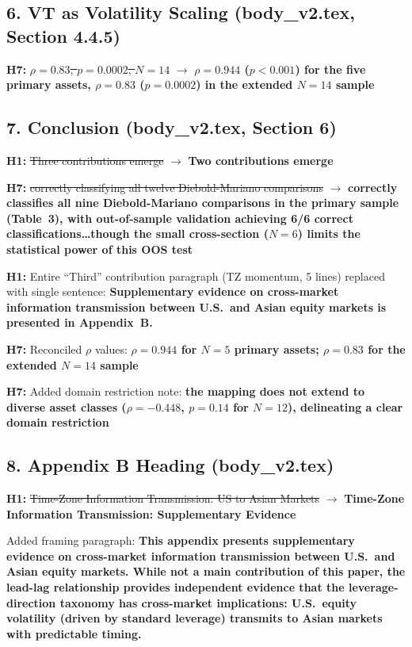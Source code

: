 \documentclass[12pt,a4paper]{article}
\newcommand{\old}[1]{\textcolor{oldred}{\st{#1}}}
\newcommand{\new}[1]{\textcolor{newgreen}{\textbf{#1}}}
\begin{document}
\subsection*{6. VT as Volatility Scaling (body\_v2.tex, Section 4.4.5)}

\textbf{H7:} \old{$\rho = 0.83$, $p = 0.0002$, $N = 14$} $\to$ \new{$\rho = 0.944$ ($p < 0.001$) for the five primary assets, $\rho = 0.83$ ($p = 0.0002$) in the extended $N = 14$ sample}

\subsection*{7. Conclusion (body\_v2.tex, Section 6)}

\textbf{H1:} \old{Three contributions emerge} $\to$ \new{Two contributions emerge}

\textbf{H7:} \old{correctly classifying all twelve Diebold-Mariano comparisons} $\to$ \new{correctly classifies all nine Diebold-Mariano comparisons in the primary sample (Table~3), with out-of-sample validation achieving 6/6 correct classifications\ldots though the small cross-section ($N = 6$) limits the statistical power of this OOS test}

\textbf{H1:} Entire ``Third'' contribution paragraph (TZ momentum, 5 lines) replaced with single sentence: \new{Supplementary evidence on cross-market information transmission between U.S.\ and Asian equity markets is presented in Appendix~B.}

\textbf{H7:} Reconciled $\rho$ values: \new{$\rho = 0.944$ for $N = 5$ primary assets; $\rho = 0.83$ for the extended $N = 14$ sample}

\textbf{H7:} Added domain restriction note: \new{the mapping does not extend to diverse asset classes ($\rho = -0.448$, $p = 0.14$ for $N = 12$), delineating a clear domain restriction}

\subsection*{8. Appendix B Heading (body\_v2.tex)}

\textbf{H1:} \old{Time-Zone Information Transmission: US to Asian Markets} $\to$ \new{Time-Zone Information Transmission: Supplementary Evidence}

Added framing paragraph: \new{This appendix presents supplementary evidence on cross-market information transmission between U.S.\ and Asian equity markets. While not a main contribution of this paper, the lead-lag relationship provides independent evidence that the leverage-direction taxonomy has cross-market implications: U.S.\ equity volatility (driven by standard leverage) transmits to Asian markets with predictable timing.}
\end{document}

